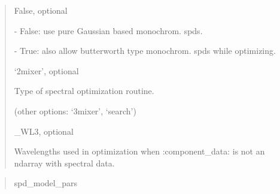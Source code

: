 \documentclass[letterpaper,10pt,english]{sphinxmanual}
\begin{document}
\begin{fulllineitems}
\begin{description}
\begin{quote}
\begin{description}
\item[{allow\_butterworth\_mono\_spds}] \leavevmode
\begin{DUlineblock}{0em}
\item[] False, optional
\item[]
\begin{DUlineblock}{\DUlineblockindent}
\item[] - False: use pure Gaussian based monochrom. spds.
\item[] - True: also allow butterworth type monochrom. spds while optimizing.
\end{DUlineblock}
\end{DUlineblock}

\item[{optimizer\_type}] \leavevmode
\begin{DUlineblock}{0em}
\item[] ‘2mixer’, optional
\item[] Type of spectral optimization routine.
\item[] (other options: ‘3mixer’, ‘search’)
\end{DUlineblock}

\item[{wl}] \leavevmode
\begin{DUlineblock}{0em}
\item[] \_WL3, optional
\item[] Wavelengths used in optimization when :component\_data: is not an
ndarray with spectral data.
\end{DUlineblock}

\end{description}\end{quote}

\item[{Returns:}] \leavevmode\begin{quote}\begin{description}
\item[{spd\_model\_pars}] \leavevmode
{}

\end{description}\end{quote}

\end{description}

\end{fulllineitems}
\end{document}
